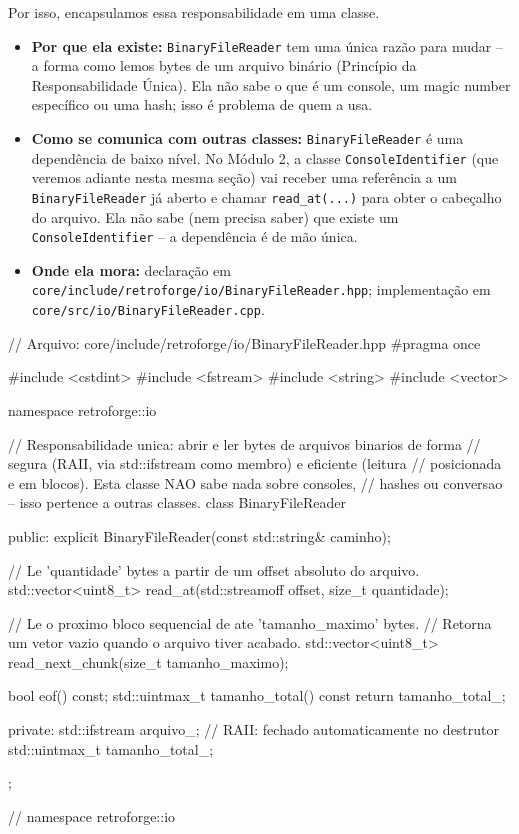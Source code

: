 Por isso, encapsulamos essa responsabilidade em uma classe.

\begin{itemize}
    \item \textbf{Por que ela existe:} \texttt{BinaryFileReader} tem uma única razão para mudar -- a forma como lemos bytes de um arquivo binário (Princípio da Responsabilidade Única). Ela não sabe o que é um console, um magic number específico ou uma hash; isso é problema de quem a usa.
    \item \textbf{Como se comunica com outras classes:} \texttt{BinaryFileReader} é uma dependência de baixo nível. No Módulo 2, a classe \texttt{ConsoleIdentifier} (que veremos adiante nesta mesma seção) vai receber uma referência a um \texttt{BinaryFileReader} já aberto e chamar \texttt{read\_at(...)} para obter o cabeçalho do arquivo. Ela não sabe (nem precisa saber) que existe um \texttt{ConsoleIdentifier} -- a dependência é de mão única.
    \item \textbf{Onde ela mora:} declaração em \texttt{core/include/retroforge/io/BinaryFileReader.hpp}; implementação em \texttt{core/src/io/BinaryFileReader.cpp}.
\end{itemize}

\begin{CaixaCodigo}
// Arquivo: core/include/retroforge/io/BinaryFileReader.hpp
#pragma once

#include <cstdint>
#include <fstream>
#include <string>
#include <vector>

namespace retroforge::io {

// Responsabilidade unica: abrir e ler bytes de arquivos binarios de forma
// segura (RAII, via std::ifstream como membro) e eficiente (leitura
// posicionada e em blocos). Esta classe NAO sabe nada sobre consoles,
// hashes ou conversao -- isso pertence a outras classes.
class BinaryFileReader {
public:
    explicit BinaryFileReader(const std::string& caminho);

    // Le 'quantidade' bytes a partir de um offset absoluto do arquivo.
    std::vector<uint8_t> read_at(std::streamoff offset, size_t quantidade);

    // Le o proximo bloco sequencial de ate 'tamanho_maximo' bytes.
    // Retorna um vetor vazio quando o arquivo tiver acabado.
    std::vector<uint8_t> read_next_chunk(size_t tamanho_maximo);

    bool eof() const;
    std::uintmax_t tamanho_total() const { return tamanho_total_; }

private:
    std::ifstream arquivo_;       // RAII: fechado automaticamente no destrutor
    std::uintmax_t tamanho_total_;
};

} // namespace retroforge::io
\end{CaixaCodigo}

